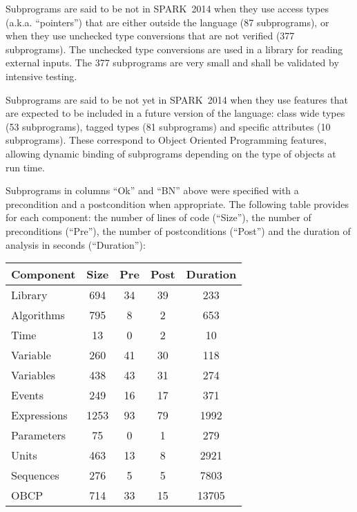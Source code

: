 \documentclass[10pt,a4paper,twocolumn]{article}
\newcommand{\newspark}{SPARK~2014\xspace}
\newcommand{\aka}{a.k.a.\xspace}
\begin{document}
\vspace{5mm}

Subprograms are said to be not in \newspark when they use access types (\aka
``pointers'') that are either outside the language (87 subprograms), or when
they use unchecked type conversions that are not verified (377 subprograms).
The unchecked type conversions are used in a library for reading external
inputs. The 377 subprograms are very small and shall be validated by intensive
testing.

Subprograms are said to be not yet in \newspark when they use features that are
expected to be included in a future version of the language: class wide types
(53 subprograms), tagged types (81 subprograms) and specific attributes (10
subprograms). These correspond to Object Oriented Programming features,
allowing dynamic binding of subprograms depending on the type of objects at run
time.

Subprograms in columns ``Ok'' and ``BN'' above were specified with a
precondition and a postcondition when appropriate.  The following table
provides for each component: the number of lines of code (``Size''), the number
of preconditions (``Pre''), the number of postconditions (``Post'') and the
duration of analysis in seconds (``Duration''):

\vspace{5mm}

\begin{tabular}{|l|c|c|c|c|}
\hline
Component   & Size & Pre & Post & Duration \\
\hline
Library     &  694 &  34 &   39 &   233 \\
\hline
Algorithms  &  795 &   8 &    2 &   653 \\
\hline
Time        &   13 &   0 &    2 &    10 \\
\hline
Variable    &  260 &  41 &   30 &   118 \\
\hline
Variables   &  438 &  43 &   31 &   274 \\
\hline
Events      &  249 &  16 &   17 &   371 \\
\hline
Expressions & 1253 &  93 &   79 &  1992 \\
\hline
Parameters  &   75 &   0 &    1 &   279 \\
\hline
Units       &  463 &  13 &    8 &  2921 \\
\hline
Sequences   &  276 &   5 &    5 &  7803 \\
\hline
OBCP        &  714 &  33 &   15 & 13705 \\
\hline
\end{tabular}
\end{document}
